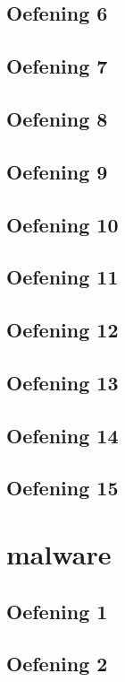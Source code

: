 \documentclass[a4paper,11pt]{report}
\begin{document}
\section{Oefening 6}

\section{Oefening 7}

\section{Oefening 8}

\section{Oefening 9}

\section{Oefening 10}

\section{Oefening 11}

\section{Oefening 12}

\section{Oefening 13}

\section{Oefening 14}

\section{Oefening 15}

\newpage

\chapter{malware}
\section{Oefening 1}

\section{Oefening 2}

\end{document}
